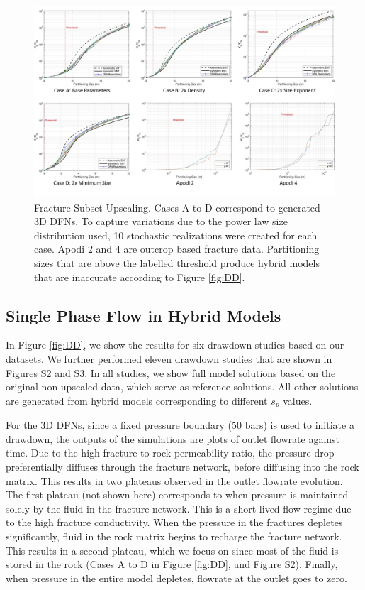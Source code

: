\documentclass[draft]{agujournal2018}
\begin{document}
\begin{figure}[h]
 \centering

 \includegraphics[width=\textwidth]{FSU/FSU_main.jpg}

 \caption{Fracture Subset Upscaling. Cases A to D correspond to generated 3D DFNs. To capture variations due to the power law size distribution used, 10 stochastic realizations were created for each case. Apodi 2 and 4 are outcrop based fracture data. Partitioning sizes that are above the labelled threshold produce hybrid models that are inaccurate according to Figure \ref{fig:DD}.}
 \label{fig:FSU}
\end{figure}

\subsection{Single Phase Flow in Hybrid Models}
In Figure \ref{fig:DD}, we show the results for six drawdown studies based on our datasets. We further performed eleven drawdown studies that are shown in Figures S2 and S3. In all studies, we show full model solutions based on the original non-upscaled data, which serve as reference solutions. All other solutions are generated from hybrid models corresponding to different $s_p$ values. 

For the 3D DFNs, since a fixed pressure boundary (50 bars) is used to initiate a drawdown, the outputs of the simulations are plots of outlet flowrate against time. Due to the high fracture-to-rock permeability ratio, the pressure drop preferentially diffuses through the fracture network, before diffusing into the rock matrix. This results in two plateaus observed in the outlet flowrate evolution. The first plateau (not shown here) corresponds to when pressure is maintained solely by the fluid in the fracture network. This is a short lived flow regime due to the high fracture conductivity. When the pressure in the fractures depletes significantly, fluid in the rock matrix begins to recharge the fracture network. This results in a second plateau, which we focus on since most of the fluid is stored in the rock (Cases A to D in Figure \ref{fig:DD}, and Figure S2). Finally, when pressure in the entire model depletes, flowrate at the outlet goes to zero.
\end{document}
